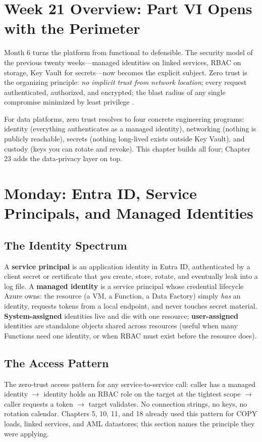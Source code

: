 \section{Week 21 Overview: Part VI Opens with the Perimeter}
Month 6 turns the platform from functional to defensible. The security model of the previous twenty weeks---managed identities on linked services, RBAC on storage, Key Vault for secrets---now becomes the explicit subject. Zero trust is the organizing principle: \emph{no implicit trust from network location}; every request authenticated, authorized, and encrypted; the blast radius of any single compromise minimized by least privilege \cite{microsoft2025entra,microsoft2025rbac}.

For data platforms, zero trust resolves to four concrete engineering programs: identity (everything authenticates as a managed identity), networking (nothing is publicly reachable), secrets (nothing long-lived exists outside Key Vault), and custody (keys you can rotate and revoke). This chapter builds all four; Chapter 23 adds the data-privacy layer on top.

\section{Monday: Entra ID, Service Principals, and Managed Identities}

\subsection{The Identity Spectrum}
A \textbf{service principal} is an application identity in Entra ID, authenticated by a client secret or certificate that \emph{you} create, store, rotate, and eventually leak into a log file. A \textbf{managed identity} is a service principal whose credential lifecycle Azure owns: the resource (a VM, a Function, a Data Factory) simply \emph{has} an identity, requests tokens from a local endpoint, and never touches secret material. \textbf{System-assigned} identities live and die with one resource; \textbf{user-assigned} identities are standalone objects shared across resources (useful when many Functions need one identity, or when RBAC must exist before the resource does).

\subsection{The Access Pattern}
The zero-trust access pattern for any service-to-service call: caller has a managed identity $\rightarrow$ identity holds an RBAC role on the target at the tightest scope $\rightarrow$ caller requests a token $\rightarrow$ target validates. No connection strings, no keys, no rotation calendar. Chapters 5, 10, 11, and 18 already used this pattern for COPY loads, linked services, and AML datastores; this section names the principle they were applying.

